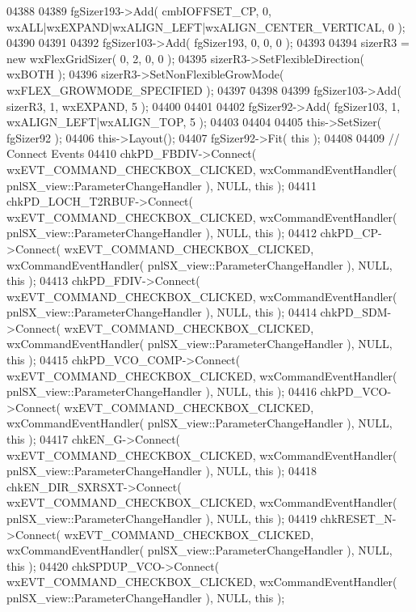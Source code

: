\begin{DoxyCode}
04388     
04389     fgSizer193->Add( cmbIOFFSET_CP, 0, wxALL|wxEXPAND|wxALIGN\_LEFT|wxALIGN\_CENTER\_VERTICAL, 0 );
04390     
04391     
04392     fgSizer103->Add( fgSizer193, 0, 0, 0 );
04393     
04394     sizerR3 = \textcolor{keyword}{new} wxFlexGridSizer( 0, 2, 0, 0 );
04395     sizerR3->SetFlexibleDirection( wxBOTH );
04396     sizerR3->SetNonFlexibleGrowMode( wxFLEX\_GROWMODE\_SPECIFIED );
04397     
04398     
04399     fgSizer103->Add( sizerR3, 1, wxEXPAND, 5 );
04400     
04401     
04402     fgSizer92->Add( fgSizer103, 1, wxALIGN\_LEFT|wxALIGN\_TOP, 5 );
04403     
04404     
04405     this->SetSizer( fgSizer92 );
04406     this->Layout();
04407     fgSizer92->Fit( \textcolor{keyword}{this} );
04408     
04409     \textcolor{comment}{// Connect Events}
04410     chkPD_FBDIV->Connect( wxEVT\_COMMAND\_CHECKBOX\_CLICKED, wxCommandEventHandler( 
      pnlSX_view::ParameterChangeHandler ), NULL, \textcolor{keyword}{this} );
04411     chkPD_LOCH_T2RBUF->Connect( wxEVT\_COMMAND\_CHECKBOX\_CLICKED, wxCommandEventHandler( 
      pnlSX_view::ParameterChangeHandler ), NULL, \textcolor{keyword}{this} );
04412     chkPD_CP->Connect( wxEVT\_COMMAND\_CHECKBOX\_CLICKED, wxCommandEventHandler( 
      pnlSX_view::ParameterChangeHandler ), NULL, \textcolor{keyword}{this} );
04413     chkPD_FDIV->Connect( wxEVT\_COMMAND\_CHECKBOX\_CLICKED, wxCommandEventHandler( 
      pnlSX_view::ParameterChangeHandler ), NULL, \textcolor{keyword}{this} );
04414     chkPD_SDM->Connect( wxEVT\_COMMAND\_CHECKBOX\_CLICKED, wxCommandEventHandler( 
      pnlSX_view::ParameterChangeHandler ), NULL, \textcolor{keyword}{this} );
04415     chkPD_VCO_COMP->Connect( wxEVT\_COMMAND\_CHECKBOX\_CLICKED, wxCommandEventHandler( 
      pnlSX_view::ParameterChangeHandler ), NULL, \textcolor{keyword}{this} );
04416     chkPD_VCO->Connect( wxEVT\_COMMAND\_CHECKBOX\_CLICKED, wxCommandEventHandler( 
      pnlSX_view::ParameterChangeHandler ), NULL, \textcolor{keyword}{this} );
04417     chkEN_G->Connect( wxEVT\_COMMAND\_CHECKBOX\_CLICKED, wxCommandEventHandler( 
      pnlSX_view::ParameterChangeHandler ), NULL, \textcolor{keyword}{this} );
04418     chkEN_DIR_SXRSXT->Connect( wxEVT\_COMMAND\_CHECKBOX\_CLICKED, wxCommandEventHandler( 
      pnlSX_view::ParameterChangeHandler ), NULL, \textcolor{keyword}{this} );
04419     chkRESET_N->Connect( wxEVT\_COMMAND\_CHECKBOX\_CLICKED, wxCommandEventHandler( 
      pnlSX_view::ParameterChangeHandler ), NULL, \textcolor{keyword}{this} );
04420     chkSPDUP_VCO->Connect( wxEVT\_COMMAND\_CHECKBOX\_CLICKED, wxCommandEventHandler( 
      pnlSX_view::ParameterChangeHandler ), NULL, \textcolor{keyword}{this} );

\end{DoxyCode}
